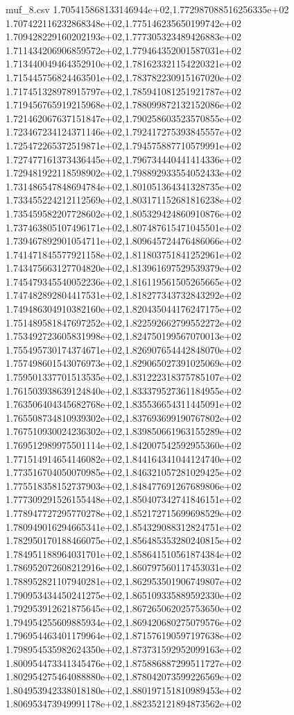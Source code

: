 \begin{filecontents*}{muf_8.csv}
1.705415868133146944e+02,1.772987088516256335e+02
1.707422116232868348e+02,1.775146235650199742e+02
1.709428229160202193e+02,1.777305323489426883e+02
1.711434206906859572e+02,1.779464352001587031e+02
1.713440049464352910e+02,1.781623321154220321e+02
1.715445756824463501e+02,1.783782230915167020e+02
1.717451328978915797e+02,1.785941081251921787e+02
1.719456765919215968e+02,1.788099872132152086e+02
1.721462067637151847e+02,1.790258603523570855e+02
1.723467234124371146e+02,1.792417275393845557e+02
1.725472265372519871e+02,1.794575887710579991e+02
1.727477161373436445e+02,1.796734440441414336e+02
1.729481922118598902e+02,1.798892933554052433e+02
1.731486547848694784e+02,1.801051364341328735e+02
1.733455224212112569e+02,1.803171152681816238e+02
1.735459582207728602e+02,1.805329424860910876e+02
1.737463805107496171e+02,1.807487615471045501e+02
1.739467892901054711e+02,1.809645724476486066e+02
1.741471845577921158e+02,1.811803751841252961e+02
1.743475663127704820e+02,1.813961697529539379e+02
1.745479345540052236e+02,1.816119561505265665e+02
1.747482892804417531e+02,1.818277343732843292e+02
1.749486304910382160e+02,1.820435044176247175e+02
1.751489581847697252e+02,1.822592662799552272e+02
1.753492723605831998e+02,1.824750199567070013e+02
1.755495730174374671e+02,1.826907654442848070e+02
1.757498601543076973e+02,1.829065027391025069e+02
1.759501337701513535e+02,1.831222318375785107e+02
1.761503938639124840e+02,1.833379527361184955e+02
1.763506404345682768e+02,1.835536654311445091e+02
1.765508734810939302e+02,1.837693699190767802e+02
1.767510930024236302e+02,1.839850661963155289e+02
1.769512989975501114e+02,1.842007542592955360e+02
1.771514914654146082e+02,1.844164341044124740e+02
1.773516704050070985e+02,1.846321057281029425e+02
1.775518358152737903e+02,1.848477691267689806e+02
1.777309291526155448e+02,1.850407342741846151e+02
1.778947727295770278e+02,1.852172715699698529e+02
1.780949016294665341e+02,1.854329088312824751e+02
1.782950170188466075e+02,1.856485353280240815e+02
1.784951188964031701e+02,1.858641510561874384e+02
1.786952072608212916e+02,1.860797560117453031e+02
1.788952821107940281e+02,1.862953501906749807e+02
1.790953434450241275e+02,1.865109335889592330e+02
1.792953912621875645e+02,1.867265062025753650e+02
1.794954255609885934e+02,1.869420680275079576e+02
1.796954463401179964e+02,1.871576190597197638e+02
1.798954535982624350e+02,1.873731592952099163e+02
1.800954473341345476e+02,1.875886887299511727e+02
1.802954275464088880e+02,1.878042073599226569e+02
1.804953942338018180e+02,1.880197151810989453e+02
1.806953473949991178e+02,1.882352121894873562e+02

\end{filecontents*}
